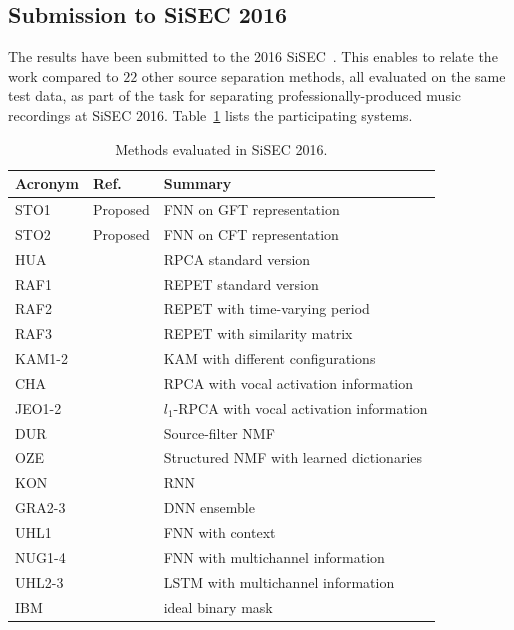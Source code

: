 \subsection{Submission to SiSEC 2016}
\label{ssec:performance}

The results have been submitted to the 2016 \ac{SiSEC}~\cite{sisec16}.
This enables to relate the work compared to $22$ other source separation methods, all evaluated on the same test data, as part of the task for separating professionally-produced music recordings at \acs{SiSEC} 2016.
Table~\ref{tab:sisec_systems} lists the participating systems.
\begin{table}[htbp]
  \centering
  \scriptsize
    \begin{tabular}{lll@{}}
        \hline
        \textbf{Acronym} & \textbf{Ref.} & \textbf{Summary}\\
        \hline
        STO1 & Proposed & \acs{FNN} on GFT representation \\
        STO2 & Proposed & \acs{FNN} on CFT representation \\
        HUA & \cite{huang12} & RPCA standard version \\
        RAF1 & \cite{rafii13} & REPET standard version \\
        RAF2 & \cite{liutkus12} & REPET with time-varying period \\
        RAF3 & \cite{rafii12} & REPET with similarity matrix \\
        KAM1-2 & \cite{liutkus15} & KAM with different configurations \\
        CHA & \cite{chan15} & RPCA with vocal activation information \\
        JEO1-2 & \cite{jeong17} &  $l_1$-RPCA with vocal activation information \\
        DUR & \cite{durrieu11} & Source-filter \acs{NMF} \\
        OZE & \cite{salaun14} & Structured \acs{NMF} with learned dictionaries \\
        KON & \cite{huang15} & \acs{RNN} \\
        GRA2-3 & \cite{grais16} & \acs{DNN} ensemble \\
        UHL1 & \cite{uhlich15} & \acs{FNN} with context \\
        NUG1-4 & \cite{nugraha16} & \acs{FNN} with multichannel information \\
        UHL2-3 & \cite{uhlich17} & \acs{LSTM} with multichannel information \\
        IBM & & ideal binary mask \\
  \end{tabular}
     \caption{Methods evaluated in \acs{SiSEC} 2016.}
    \label{tab:sisec_systems}

\end{table}

